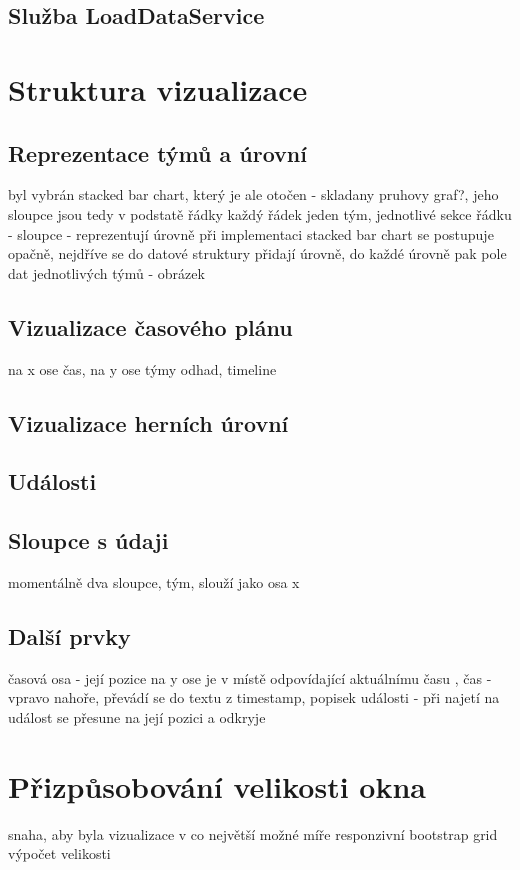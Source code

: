 \documentclass[
  digital, %
  oneside, %
  table,   %
  nolof,     %
  nolot,     %
]{fithesis3}
\begin{document}
\subsection{Služba LoadDataService}

\section{Struktura vizualizace}
\subsection{Reprezentace týmů a úrovní}
byl vybrán stacked bar chart, který je ale otočen - skladany pruhovy graf?, jeho sloupce jsou tedy v podstatě řádky
každý řádek jeden tým, jednotlivé sekce řádku - sloupce - reprezentují úrovně
při implementaci stacked bar chart se postupuje opačně, nejdříve se do datové struktury přidají úrovně, do každé úrovně pak pole dat jednotlivých týmů - obrázek
\subsection{Vizualizace časového plánu}
na x ose čas, na y ose týmy
odhad, timeline
\subsection{Vizualizace herních úrovní}
\subsection{Události}
\subsection{Sloupce s údaji}
momentálně dva sloupce, tým, slouží jako osa x
\subsection{Další prvky}
časová osa - její pozice na y ose je v místě odpovídající aktuálnímu času , čas - vpravo nahoře, převádí se do textu z timestamp, popisek události - při najetí na událost se přesune na její pozici a odkryje

\section{Přizpůsobování velikosti okna}
snaha, aby byla vizualizace v co největší možné míře responzivní
bootstrap grid
výpočet velikosti
\end{document}
